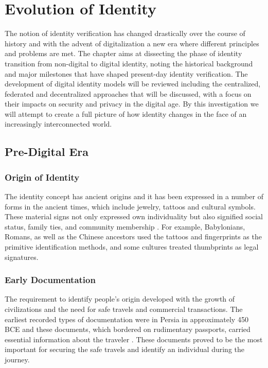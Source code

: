 \chapter{Evolution of Identity} \label{ch:identity}

The notion of identity verification has changed drastically over the course of history and with the advent of digitalization a new era where different principles and 
problems are met. The chapter aims at dissecting the phase of identity transition from non-digital to digital identity, noting the historical background and major milestones
that have shaped present-day identity verification. The development of digital identity models will be reviewed including the centralized, federated and decentralized 
approaches that will be discussed, with a focus on their impacts on security and privacy in the digital age. By this investigation we will attempt to create a full picture 
of how identity changes in the face of an increasingly interconnected world.

\section{Pre-Digital Era}

\subsection{Origin of Identity}

The identity concept has ancient origins and it has been expressed in a number of forms in the ancient times, which include jewelry, tattoos and cultural symbols. These 
material signs not only expressed own individuality but also signified social status, family ties, and community membership \cite{businessreporter}. For example, Babylonians,
Romans, as well as the Chinese ancestors used the tattoos and fingerprints as the primitive identification methods, and some cultures treated thumbprints as legal signatures.

\subsection{Early Documentation}

The requirement to identify people's origin developed with the growth of civilizations and the need for safe travels and commercial transactions. The earliest recorded types
of documentation were in Persia in approximately 450 BCE and these documents, which bordered on rudimentary passports, carried essential information about the traveler
\cite{businessreporter}. These documents proved to be the most important for securing the safe travels and identify an individual during the journey.

